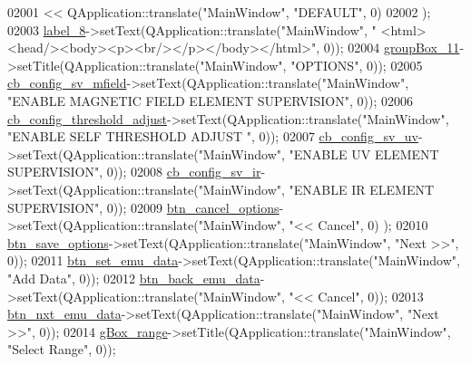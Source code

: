 \begin{DoxyCode}
02001          << QApplication::translate(\textcolor{stringliteral}{"MainWindow"}, \textcolor{stringliteral}{"DEFAULT"}, 0)
02002         );
02003         \hyperlink{a00027_af183bfbfb9f38bbdd60caf92b15e23dc}{label\_8}->setText(QApplication::translate(\textcolor{stringliteral}{"MainWindow"}, \textcolor{stringliteral}{"
      <html><head/><body><p><br/></p></body></html>"}, 0));
02004         \hyperlink{a00027_a417cb0342ea95d3fe5f7e3f4feeb6515}{groupBox\_11}->setTitle(QApplication::translate(\textcolor{stringliteral}{"MainWindow"}, \textcolor{stringliteral}{"OPTIONS"}, 0));
02005         \hyperlink{a00027_a0a83284035ab2dbaeb39946522434986}{cb\_config\_sv\_mfield}->setText(QApplication::translate(\textcolor{stringliteral}{"MainWindow"}, \textcolor{stringliteral}{"ENABLE
       MAGNETIC FIELD ELEMENT SUPERVISION"}, 0));
02006         \hyperlink{a00027_a433ffc427e1103e6c2939f949ee5e5b5}{cb\_config\_threshold\_adjust}->setText(QApplication::translate(\textcolor{stringliteral}{"MainWindow"},
       \textcolor{stringliteral}{"ENABLE SELF THRESHOLD ADJUST "}, 0));
02007         \hyperlink{a00027_a3a93cd0a3f3738aad252d063a8677839}{cb\_config\_sv\_uv}->setText(QApplication::translate(\textcolor{stringliteral}{"MainWindow"}, \textcolor{stringliteral}{"ENABLE UV ELEMENT
       SUPERVISION"}, 0));
02008         \hyperlink{a00027_a4db3ccfbbf8c5222dd2f042d3073bbe8}{cb\_config\_sv\_ir}->setText(QApplication::translate(\textcolor{stringliteral}{"MainWindow"}, \textcolor{stringliteral}{"ENABLE IR ELEMENT
       SUPERVISION"}, 0));
02009         \hyperlink{a00027_a39d7e34aed8750622569f0819dd7c8c2}{btn\_cancel\_options}->setText(QApplication::translate(\textcolor{stringliteral}{"MainWindow"}, \textcolor{stringliteral}{"<< Cancel"}, 0)
      );
02010         \hyperlink{a00027_a409e5b794dbab22d7b958be406b6a030}{btn\_save\_options}->setText(QApplication::translate(\textcolor{stringliteral}{"MainWindow"}, \textcolor{stringliteral}{"Next >>"}, 0));
02011         \hyperlink{a00027_ad05944ce9c8afb0ab60549a326b8e0af}{btn\_set\_emu\_data}->setText(QApplication::translate(\textcolor{stringliteral}{"MainWindow"}, \textcolor{stringliteral}{"Add Data"}, 0));
02012         \hyperlink{a00027_ab6199bde688a9b2e91e192278190dda7}{btn\_back\_emu\_data}->setText(QApplication::translate(\textcolor{stringliteral}{"MainWindow"}, \textcolor{stringliteral}{"<< Cancel"}, 0));
02013         \hyperlink{a00027_a11126ea7922009f1354c9bfefb93f5e9}{btn\_nxt\_emu\_data}->setText(QApplication::translate(\textcolor{stringliteral}{"MainWindow"}, \textcolor{stringliteral}{"Next >>"}, 0));
02014         \hyperlink{a00027_a3c12d0504a310784c3820d1a9ad469c2}{gBox\_range}->setTitle(QApplication::translate(\textcolor{stringliteral}{"MainWindow"}, \textcolor{stringliteral}{"Select Range"}, 0));

\end{DoxyCode}
